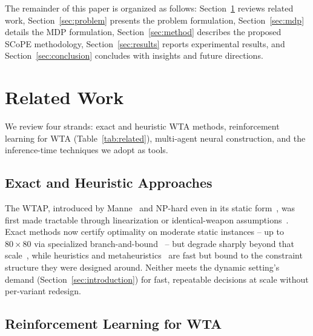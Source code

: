 The remainder of this paper is organized as follows: Section~\ref{sec:related} reviews related work, Section~\ref{sec:problem} presents the problem formulation, Section~\ref{sec:mdp} details the MDP formulation, Section~\ref{sec:method} describes the proposed SCoPE methodology, Section~\ref{sec:results} reports experimental results, and Section~\ref{sec:conclusion} concludes with insights and future directions.

\section{Related Work}
\label{sec:related}

We review four strands: exact and heuristic WTA methods, reinforcement learning for WTA (Table~\ref{tab:related}), multi-agent neural construction, and the inference-time techniques we adopt as tools.

\subsection{Exact and Heuristic Approaches}

The WTAP, introduced by Manne~\cite{manne1958target} and NP-hard even in its static form~\cite{lloyd1986weapons}, was first made tractable through linearization or identical-weapon assumptions~\cite{day1966allocating,firstman1960approximating,hodson1971linear,bracken1968selected,denbroeder1959optimum}. Exact methods now certify optimality on moderate static instances -- up to $80\times80$ via specialized branch-and-bound~\cite{ahuja2007exact} -- but degrade sharply beyond that scale~\cite{johansson2009empirical,kline2019weapon}, while heuristics and metaheuristics~\cite{kolitz1988analysis,lee2002immunity,lee2003efficiently,lee2003genetic,durgut2017artificial,sonuc2017parallel,chang2018solving,metler1990suite} are fast but bound to the constraint structure they were designed around. Neither meets the dynamic setting's demand (Section~\ref{sec:introduction}) for fast, repeatable decisions at scale without per-variant redesign.

\subsection{Reinforcement Learning for WTA}


